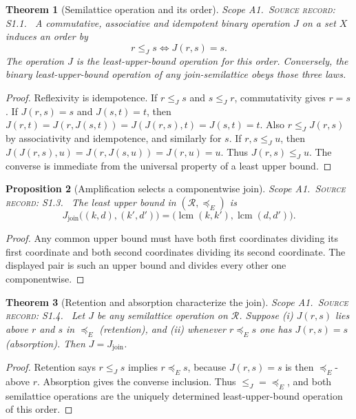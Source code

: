 \documentclass[11pt,oneside,openany]{book}
\newtheorem{theorem}{Theorem}[chapter]
\newtheorem{proposition}[theorem]{Proposition}
\theoremstyle{definition}
\theoremstyle{remark}
\newcommand{\lcmop}{\operatorname{lcm}}
\newcommand{\scope}[1]{\textsf{\small Scope #1.}\ }
\newcommand{\record}[1]{\textup{\textsc{Source record: #1.}}\ }
\newcommand{\Rh}{\mathcal{R}}
\newcommand{\join}{J_{\mathrm{join}}}
\begin{document}
\begin{theorem}[Semilattice operation and its order]\label{thm:semi}
\scope{A1}\record{S1.1} A commutative, associative and idempotent binary operation \(J\) on a set \(X\) induces an order by
\[
 r\le_J s\iff J(r,s)=s.
\]
The operation \(J\) is the least-upper-bound operation for this order. Conversely, the binary least-upper-bound operation of any join-semilattice obeys those three laws.
\end{theorem}
\begin{proof}
Reflexivity is idempotence. If \(r\le_J s\) and \(s\le_J r\), commutativity gives \(r=s\). If \(J(r,s)=s\) and \(J(s,t)=t\), then \(J(r,t)=J(r,J(s,t))=J(J(r,s),t)=J(s,t)=t\). Also \(r\le_J J(r,s)\) by associativity and idempotence, and similarly for \(s\). If \(r,s\le_J u\), then \(J(J(r,s),u)=J(r,J(s,u))=J(r,u)=u\). Thus \(J(r,s)\le_J u\). The converse is immediate from the universal property of a least upper bound.
\end{proof}

\begin{proposition}[Amplification selects a componentwise join]\label{prop:amplification}
\scope{A1}\record{S1.3} The least upper bound in \((\Rh,\preceq_E)\) is
\[
 \join\big((k,d),(k',d')\big)
 =\big(\lcmop(k,k'),\lcmop(d,d')\big).
\]
\end{proposition}
\begin{proof}
Any common upper bound must have both first coordinates dividing its first coordinate and both second coordinates dividing its second coordinate. The displayed pair is such an upper bound and divides every other one componentwise.
\end{proof}

\begin{theorem}[Retention and absorption characterize the join]\label{thm:absorb}
\scope{A1}\record{S1.4} Let \(J\) be any semilattice operation on \(\Rh\). Suppose (i) \(J(r,s)\) lies above \(r\) and \(s\) in \(\preceq_E\) (\emph{retention}), and (ii) whenever \(r\preceq_Es\) one has \(J(r,s)=s\) (\emph{absorption}). Then \(J=\join\).
\end{theorem}
\begin{proof}
Retention says \(r\le_Js\) implies \(r\preceq_Es\), because \(J(r,s)=s\) is then \(\preceq_E\)-above \(r\). Absorption gives the converse inclusion. Thus \(\le_J=\preceq_E\), and both semilattice operations are the uniquely determined least-upper-bound operation of this order.
\end{proof}
\end{document}
